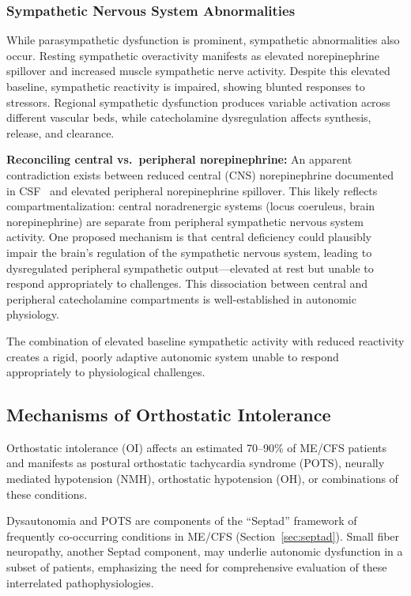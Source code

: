 \subsubsection{Sympathetic Nervous System Abnormalities}

While parasympathetic dysfunction is prominent, sympathetic abnormalities also occur. Resting sympathetic overactivity manifests as elevated norepinephrine spillover and increased muscle sympathetic nerve activity. Despite this elevated baseline, sympathetic reactivity is impaired, showing blunted responses to stressors. Regional sympathetic dysfunction produces variable activation across different vascular beds, while catecholamine dysregulation affects synthesis, release, and clearance.

\textbf{Reconciling central vs.\ peripheral norepinephrine:} An apparent contradiction exists between reduced central (CNS) norepinephrine documented in CSF~\cite{walitt2024deep} and elevated peripheral norepinephrine spillover. This likely reflects compartmentalization: central noradrenergic systems (locus coeruleus, brain norepinephrine) are separate from peripheral sympathetic nervous system activity. One proposed mechanism is that central deficiency could plausibly impair the brain's regulation of the sympathetic nervous system, leading to dysregulated peripheral sympathetic output---elevated at rest but unable to respond appropriately to challenges. This dissociation between central and peripheral catecholamine compartments is well-established in autonomic physiology.

The combination of elevated baseline sympathetic activity with reduced reactivity creates a rigid, poorly adaptive autonomic system unable to respond appropriately to physiological challenges.

\subsection{Mechanisms of Orthostatic Intolerance}
\label{sec:orthostatic-mechanisms}

Orthostatic intolerance (OI) affects an estimated 70--90\% of ME/CFS patients and manifests as postural orthostatic tachycardia syndrome (POTS), neurally mediated hypotension (NMH), orthostatic hypotension (OH), or combinations of these conditions.

Dysautonomia and POTS are components of the ``Septad'' framework of frequently co-occurring conditions in ME/CFS (Section~\ref{sec:septad}). Small fiber neuropathy, another Septad component, may underlie autonomic dysfunction in a subset of patients, emphasizing the need for comprehensive evaluation of these interrelated pathophysiologies.

